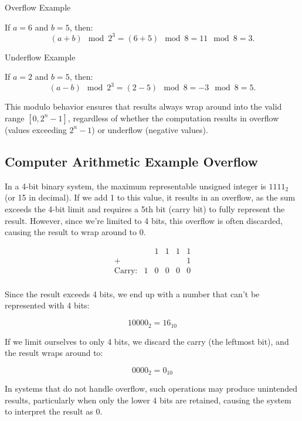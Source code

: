 Overflow Example

If \( a = 6 \) and \( b = 5 \), then:
\[
(a + b) \mod 2^3 = (6 + 5) \mod 8 = 11 \mod 8 = 3.
\]

Underflow Example

If \( a = 2 \) and \( b = 5 \), then:
\[
(a - b) \mod 2^3 = (2 - 5) \mod 8 = -3 \mod 8 = 5.
\]

\vspace{\baselineskip}\par
This modulo behavior ensures that results always wrap around into the valid range \( [0, 2^n - 1] \), regardless of whether the computation results in overflow (values exceeding \( 2^n - 1 \)) or underflow (negative values).

\subsection{Computer Arithmetic Example Overflow} \label{subsub:overflow_example}
In a 4-bit binary system, the maximum representable unsigned integer is \( 1111_2 \) (or 15 in decimal). If we add 1 to this value, it results in an overflow, as the sum exceeds the 4-bit limit and requires a 5th bit (carry bit) to fully represent the result. However, since we’re limited to 4 bits, this overflow is often discarded, causing the result to wrap around to 0.

\[
\begin{array}{rccccc}
       & & 1 & 1 & 1 & 1 \\ %
    +  & &   &   &   & 1 \\ %
    \hline
\text{Carry:} & 1 & 0 & 0 & 0 & 0 \\ %
\end{array}
\]

Since the result exceeds 4 bits, we end up with a number that can't be represented with 4 bits:

\[
10000_2 = 16_{10}
\]

If we limit ourselves to only 4 bits, we discard the carry (the leftmost bit), and the result wraps around to:

\[
0000_2 = 0_{10}
\]

In systems that do not handle overflow, such operations may produce unintended results, particularly when only the lower 4 bits are retained, causing the system to interpret the result as 0.

